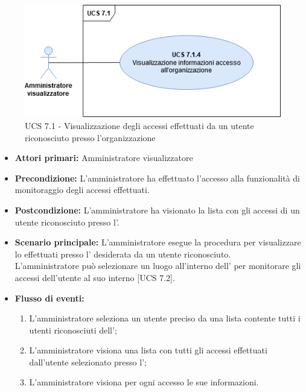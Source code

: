 \begin{figure}[h]
	\centering
	\includegraphics[scale=0.5]{Sezioni/UseCase/Immagini/UCS7.1.png}
	\caption{UCS 7.1 - Visualizzazione degli accessi effettuati da un utente riconosciuto presso l'organizzazione}
\end{figure}

\begin{itemize}
	\item \textbf{Attori primari:} Amministratore visualizzatore
	\item \textbf{Precondizione:} L'amministratore ha effettuato l'accesso alla funzionalità di monitoraggio degli accessi effettuati.
	\item \textbf{Postcondizione:} L'amministratore ha visionato la lista con gli accessi di un utente riconosciuto presso l'.
	\item \textbf{Scenario principale:} L'amministratore esegue la procedura per visualizzare lo  effettuati presso l' desiderata da un utente riconosciuto.\\
	L'amministratore può selezionare un luogo all'interno dell' per monitorare gli accessi dell'utente al suo interno [UCS 7.2].
	\item \textbf{Flusso di eventi:}
	\begin{enumerate}
		\item L'amministratore seleziona un utente preciso da una lista contente tutti i utenti riconosciuti dell';
		\item L'amministratore visiona una lista con tutti gli accessi effettuati dall'utente selezionato presso l';
		\item L'amministratore visiona per ogni accesso le sue informazioni.
	\end{enumerate}
\end{itemize}

